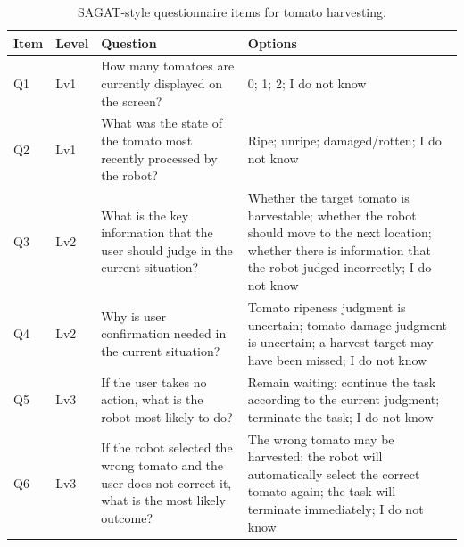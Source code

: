 \begin{table}[t]
\centering
\caption{SAGAT-style questionnaire items for tomato harvesting.}
\label{tab:app_sagat_tomato_questions}
\scriptsize
\setlength{\tabcolsep}{3pt}
\begin{tabularx}{\textwidth}{p{}p{}p{}X}
\toprule
\textbf{Item} & \textbf{Level} & \textbf{Question} & \textbf{Options} \\
\midrule
Q1 & Lv1 & How many tomatoes are currently displayed on the screen? & 0; 1; 2; I do not know \\
Q2 & Lv1 & What was the state of the tomato most recently processed by the robot? & Ripe; unripe; damaged/rotten; I do not know \\
Q3 & Lv2 & What is the key information that the user should judge in the current situation? & Whether the target tomato is harvestable; whether the robot should move to the next location; whether there is information that the robot judged incorrectly; I do not know \\
Q4 & Lv2 & Why is user confirmation needed in the current situation? & Tomato ripeness judgment is uncertain; tomato damage judgment is uncertain; a harvest target may have been missed; I do not know \\
Q5 & Lv3 & If the user takes no action, what is the robot most likely to do? & Remain waiting; continue the task according to the current judgment; terminate the task; I do not know \\
Q6 & Lv3 & If the robot selected the wrong tomato and the user does not correct it, what is the most likely outcome? & The wrong tomato may be harvested; the robot will automatically select the correct tomato again; the task will terminate immediately; I do not know \\
\bottomrule
\end{tabularx}
\end{table}

